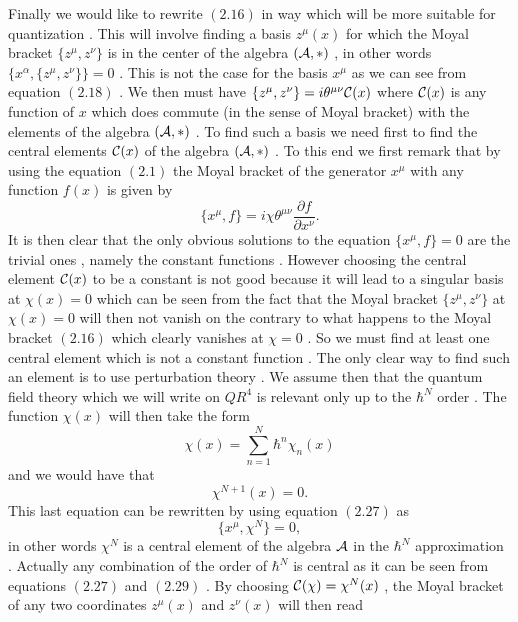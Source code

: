 \documentclass[a4paper,12pt]{article}
\begin{document}
Finally we would like to rewrite $(2.16)$ in way which will be
more suitable for quantization . This will involve finding a basis
$z^{\mu}(x)$ for which  the Moyal bracket $\{z^{\mu},z^{\nu}\}$
is in the center of the algebra $({\cal A},*)$ , in other words
$\{x^{\alpha},\{z^{\mu},z^{\nu}\}\}=0$ . This is not the case for
the basis $x^{\mu}$ as we can see from equation $(2.18)$ . We then
must have $\{z^{\mu},z^{\nu}\}=i{\theta}^{{\mu}{\nu}}{\cal C}(x)$
where ${\cal C}(x)$ is any function of $x$ which does commute (in
the sense of Moyal bracket) with the elements of the algebra
$({\cal A},*)$ . To find such a basis we need first to find the
central elements ${\cal C}(x)$ of the algebra $({\cal A},*)$ . To
this end we first remark that by using the equation $(2.1)$ the
Moyal bracket of the generator $x^{\mu}$ with any function $f(x)$
is given by
\begin{equation}
\{x^{\mu},f\}=i{\chi}{\theta}^{{\mu}{\nu}}\frac{\partial{f}}{\partial{x^{\nu}}}.
\end{equation}
It is then clear that the only obvious solutions to the equation
$\{x^{\mu},f\}=0$ are the trivial ones , namely the constant
functions . However choosing the central element ${\cal C}(x)$ to
be a constant is not good because it will lead to a singular
basis at ${\chi}(x)=0$ which can be seen from the fact that the
Moyal bracket $\{z^{\mu},z^{\nu}\}$ at ${\chi}(x)=0$ will then not
vanish on the contrary to what happens to the Moyal bracket
$(2.16)$ which clearly vanishes at ${\chi}=0$ . So we must find at
least one central element which is not a constant function . The
only clear way to find such an element is to use perturbation
theory . We assume then that the quantum field theory which we
will write on $QR^4$ is relevant only up to the ${\hbar}^N$ order
. The function ${\chi}(x)$ will then take the form
\begin{equation}
{\chi}(x)=\sum_{n=1}^{N}{\hbar}^n{\chi}_n(x)
\end{equation}
and we would have that
\begin{equation}
{\chi}^{N+1}(x)=0.
\end{equation}
This last equation can be rewritten by using  equation $(2.27)$ as
\begin{equation}
\{x^{\mu},{\chi}^N\}=0,
\end{equation}
in other words ${\chi}^N$ is a central element of the algebra
${\cal A}$ in the ${\hbar}^N$ approximation . Actually any
combination of the order of ${\hbar}^N$ is central as it can be
seen from equations $(2.27)$ and $(2.29)$ . By choosing ${\cal
C}(\chi)={\chi}^N(x)$ , the Moyal bracket of any two coordinates
$z^{\mu}(x)$ and $z^{\nu}(x)$ will then read
\end{document}

